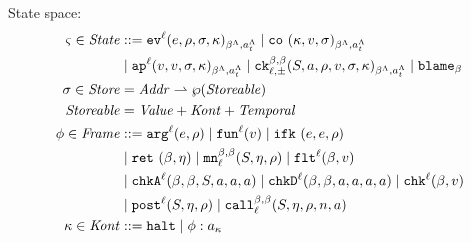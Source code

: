 \documentclass[preprint,onecolumn,9pt]{sigplanconf} %
\begin{document}
State space:
\begin{align*}
  \mstate \in \State &::=
      \ev[^\mlab]{\mexp, \menv, \msto, \mkont}{\msmlab}{\mstimeline}
 \alt \co{\mkont, \mval, \msto}{\msmlab}{\mstimeline} \\
&\alt \ap[^\mlab]{\mval, \mval, \msto, \mkont}{\msmlab}{\mstimeline}
 \alt \ck{\mmlab}{\mmlab}{\mlab}{\pm}{\mscon, \maddr, \menv, \mval, \msto, \mkont}{\msmlab}{\mstimeline}
 \alt \sblame{\mmlab} \\
\msto \in \Store &= \Addr \parto \wp(\Storeable) \\
\Storeable &= \Value + \Kont + \TContract \\
\mframe \in \Frame &::=
      \kar[^\mlab]{\mexp,\menv}
 \alt \kfn[^\mlab]{\mval}
 \alt \kif{\mexp, \mexp, \menv} \\
&\alt \krt{\mmlab, \mtimeline}
 \alt \kmon{\mmlab}{\mmlab}{\mlab}{\mscon, \mtimeline, \menv}
 \alt \kflat[^\mlab]{\mmlab, \mval} \\
&\alt \kchkA[^\mlab]{\mmlab, \mmlab, \mscon, \maddr, \maddr, \maddr}
 \alt \kchkD[^\mlab]{\mmlab, \mmlab, \maddr, \maddr, \maddr, \maddr}
 \alt \kcheck[^\mlab]{\mmlab, \mval} \\
&\alt \kpost[^\mlab]{\mscon, \mtimeline, \menv}
 \alt \kmcall{\mmlab}{\mmlab}{\mlab}{\mscon, \mtimeline, \menv, \mname, \maddr} \\
\mkont \in \Kont &::= \kmt \alt \spush{\mframe}{\mkaddr}
\end{align*}

\end{document}

